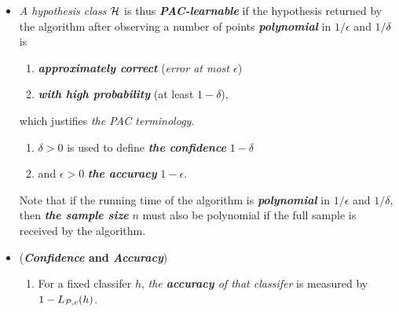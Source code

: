 \documentclass[11pt]{article}
\begin{document}
\begin{itemize}

\item \begin{remark}
\emph{A hypothesis class} ${\mathcal H}$ is thus \emph{\textbf{PAC-learnable}} if the hypothesis returned by the algorithm after observing a number of points \emph{\textbf{polynomial}} in $1/\epsilon$ and $1/\delta$ is
\begin{enumerate}
\item \emph{\textbf{approximately correct}} (\emph{error at most $\epsilon$}) 
\item \emph{\textbf{with high probability}} (at least $1 - \delta$), 
\end{enumerate}
which justifies \emph{the PAC terminology}. 
\begin{enumerate}
\item $\delta > 0$ is used to define \emph{\textbf{the confidence}} $1 - \delta$
\item and $\epsilon > 0$ \emph{\textbf{the accuracy}} $1-\epsilon$. 
\end{enumerate}
Note that if the running time of the algorithm is \emph{\textbf{polynomial}} in $1/\epsilon$ and $1/\delta$, then \emph{\textbf{the sample size}} $n$ must also be polynomial if the full sample is received by the algorithm.
\end{remark}

\item \begin{remark} (\textbf{\emph{Confidence} and \emph{Accuracy}})
\begin{enumerate}
\item For a fixed classifer $h$, \emph{the \textbf{accuracy} of that classifer} is measured by $1 - L_{{\mathcal P}, c}(h)$. 


\end{enumerate}
\end{remark}
\end{itemize}
\end{document}

